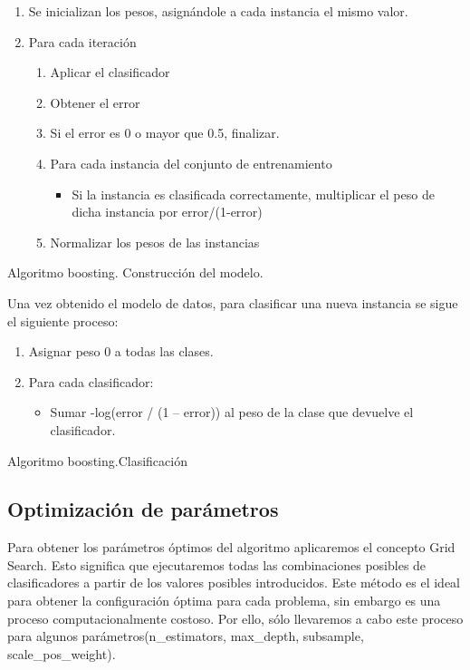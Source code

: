 \begin{algorithm}
	\begin{enumerate}
		\item Se inicializan los pesos, asignándole a cada instancia el mismo valor.
		\item Para cada iteración
		\begin{enumerate}
			\item Aplicar el clasificador 
			\item Obtener el error
			\item Si el error es 0 o mayor que 0.5, finalizar.
			\item Para cada instancia del conjunto de entrenamiento
			\begin{itemize}
				\item Si la instancia es clasificada correctamente, multiplicar el peso de dicha instancia por error/(1-error)
				
			\end{itemize}
			\item Normalizar los pesos de las instancias
		\end{enumerate}
	\end{enumerate}
	\caption{Algoritmo boosting. Construcción del modelo.}
\end{algorithm} 

Una vez obtenido el modelo de datos, para clasificar una nueva instancia se sigue el siguiente proceso:
\begin{algorithm}
	\begin{enumerate}
		\item Asignar peso 0 a todas las clases.
		\item Para cada clasificador:
		\begin{itemize}
			\item Sumar -log(error / (1 – error)) al peso de la clase que devuelve el clasificador.
		\end{itemize}
	\end{enumerate}
	\caption{Algoritmo boosting.Clasificación}
\end{algorithm}
\newpage
\subsection{Optimización de parámetros}
Para obtener los parámetros óptimos del algoritmo aplicaremos el concepto Grid
Search\cite{grid_search}. Esto significa que ejecutaremos todas las combinaciones posibles de
clasificadores a partir de los valores posibles introducidos. Este método es el
ideal para obtener la configuración óptima para cada problema, sin embargo es
una proceso computacionalmente costoso. Por ello, sólo llevaremos a cabo este
proceso para algunos parámetros(n\_estimators, max\_depth, subsample,
scale\_pos\_weight).
\medskip

